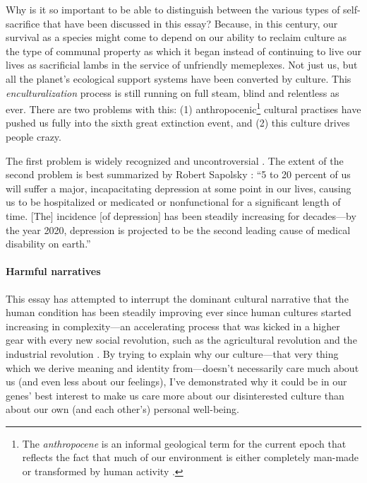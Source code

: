 \documentclass{article}
\begin{document}
Why is it so important to be able to distinguish between the various types
of self-sacrifice that have been discussed in this essay? Because, in this century,
our survival as a species might come to depend on our ability to reclaim culture
as the type of communal property as which it began instead of continuing to live
our lives as sacrificial lambs in the service of unfriendly memeplexes. Not
just us, but all the planet's ecological support systems have been converted by
culture. This \textit{enculturalization} process is still running on full
steam, blind and relentless as ever. There are two problems with this: (1)
anthropocenic\footnote{The \emph{anthropocene} is an informal geological term
for the current epoch that reflects the fact that much of our environment is
either completely man-made or transformed by human activity
\citep{revkin2011}.} cultural practises have pushed us fully into the sixth
great extinction event, and (2) this culture drives people crazy.

The first problem is widely recognized and uncontroversial \citep{iucn2009,
pimm1995}. The extent of the second problem is best summarized by Robert
Sapolsky \citeyearpar[ch.~14]{sapolsky2004}: “5 to 20 percent of us will suffer
a major, incapacitating depression at some point in our lives, causing us to be
hospitalized or medicated or nonfunctional for a significant length of time.
[The] incidence [of depression] has been steadily increasing for decades---by the year 2020,
depression is projected to be the second leading cause of medical disability on
earth.”

\paragraph{Harmful narratives}

This essay has attempted to interrupt the dominant cultural narrative that the
human condition has been steadily improving ever since human cultures started
increasing in complexity---an accelerating process that was kicked in a higher
gear with every new social revolution, such as the agricultural revolution and
the industrial revolution \citep{botton2013, quinn1992}. By trying to explain
why our culture---that very thing which we derive meaning and identity
from---doesn't necessarily care much about us (and even less about our
feelings), I've demonstrated why it could be in our genes' best interest to
make us care more about our disinterested culture than about our own (and each
other's) personal well-being.
\end{document}
